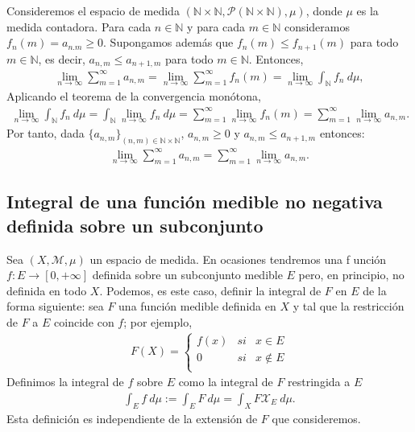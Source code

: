 \begin{ejemplo}
    Consideremos el espacio de medida $(\mathbb{N} \times \mathbb{N}, \mathcal{P}(\mathbb{N} \times \mathbb{N}), \mu)$, donde $\mu$ es la medida contadora. Para cada $n\in \mathbb{N}$ y para cada $m\in \mathbb{N}$  consideramos $f_n(m) = a_{n.m} \ge 0$. Supongamos además que $f_n(m) \leq f_{n+1}(m)$ para todo $m \in \mathbb{N}$, es decir, $a_{n,m} \leq a_{n+1,m}$ para todo $m \in \mathbb{N}$. Entonces,
    \begin{align*}
        \lim_{n \to \infty}{\sum_{m=1}^{\infty}{a_{n,m}}} = \lim_{n \to \infty}{\sum_{m=1}^{\infty}{f_n(m)}} = \lim_{n \to \infty}{\int_{\mathbb{N}}{{f_n \ d\mu}}},
    \end{align*}
    Aplicando el teorema de la convergencia monótona,
    \begin{align*}
        \lim_{n \to \infty}{\int_{\mathbb{N}}{{f_n \ d\mu}}} = \int_{\mathbb{N}}{{\lim_{n \to \infty}{f_n \ d\mu}}} = \sum_{m=1}^{\infty}{\lim_{n \to \infty}{f_n(m)}} = \sum_{m=1}^{\infty}{\lim_{n \to \infty}{a_{n,m}}}.
    \end{align*}
    Por tanto, dada $\{a_{n,m}\}_{(n,m) \in \mathbb{N} \times \mathbb{N}}$, $a_{n,m} \ge 0$ y $a_{n,m} \leq a_{n+1,m}$ entonces:
    \begin{align*}
        \lim_{n \to \infty}{\sum_{m=1}^{\infty}{a_{n,m}}} = \sum_{m=1}^{\infty}{\lim_{n \to \infty}{a_{n,m}}}.
    \end{align*}
\end{ejemplo}

\subsection{Integral de una función medible no negativa definida sobre un subconjunto}
Sea $(X, \mathcal{M}, \mu)$ un espacio de medida. En ocasiones tendremos una f unción $f: E \longrightarrow [0,+\infty]$ definida sobre un subconjunto medible $E$ pero, en principio, no definida en todo $X$. Podemos, es este caso, definir la integral de $F$ en $E$ de la forma siguiente: sea $F$ una función medible definida en $X$ y tal que la restricción de $F$ a $E$ coincide con $f$; por ejemplo,
\begin{align*}
    F(X) = \left\{ \begin{array}{lcc}
                       f(x) & si & x \in E      \\
                       0    & si & x \not \in E \\
                   \end{array}
    \right.
\end{align*}
Definimos la integral de $f$ sobre $E$ como la integral de $F$ restringida a $E$
\begin{align*}
    \int_{E}{f \ d\mu} := \int_{E}{F \ d\mu} = \int_{X}{F \mathcal{X}_E \ d\mu}.
\end{align*}
Esta definición es independiente de la extensión de $F$ que consideremos.

